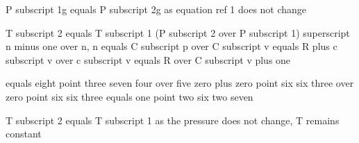 P subscript 1g equals P subscript 2g as equation ref 1 does not change

T subscript 2 equals T subscript 1 (P subscript 2 over P subscript 1) superscript n minus one over n, n equals C subscript p over C subscript v equals R plus c subscript v over c subscript v equals R over C subscript v plus one

equals eight point three seven four over five zero plus zero point six six three over zero point six six three equals one point two six two seven

T subscript 2 equals T subscript 1 as the pressure does not change, T remains constant